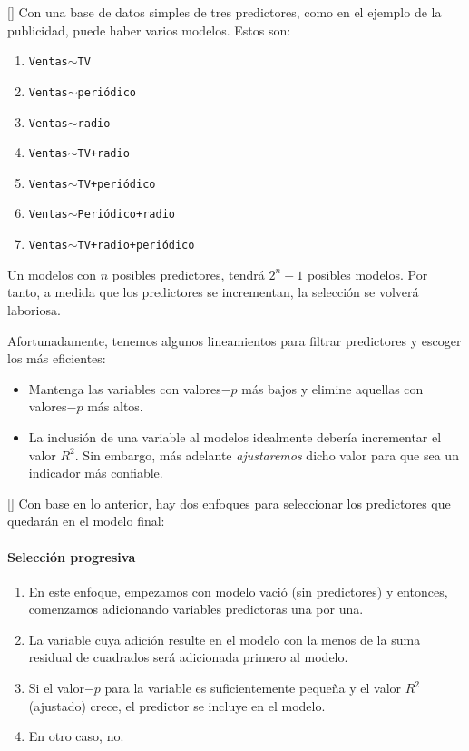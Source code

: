 []{}
Con una base de datos simples de tres predictores, como en el ejemplo de la publicidad, puede haber varios modelos. Estos son:
\begin{enumerate}[Modelo 1:]
 \item \texttt{Ventas$\sim$TV}
 \item \texttt{Ventas$\sim$periódico}
 \item \texttt{Ventas$\sim$radio}
 \item \texttt{Ventas$\sim$TV+radio}
 \item \texttt{Ventas$\sim$TV+periódico}
 \item \texttt{Ventas$\sim$Periódico+radio}
 \item \texttt{Ventas$\sim$TV+radio+periódico}
\end{enumerate}



\begin{rem}
 Un modelos con $n$ posibles predictores, tendrá $2^{n}-1$ posibles modelos. Por tanto, a medida que los predictores se incrementan, la selección se volverá laboriosa.
\end{rem}



Afortunadamente, tenemos algunos lineamientos para filtrar predictores y escoger los más eficientes:
\begin{itemize}
 \item Mantenga las variables con valores$-p$ más bajos y elimine aquellas con valores$-p$ más altos. 
 \item La inclusión de una variable al modelos idealmente debería incrementar el valor $R^{2}.$  Sin embargo, más adelante \emph{ajustaremos} dicho valor para que sea un indicador más confiable.
\end{itemize}


[]{}
Con base en lo anterior, hay dos enfoques para seleccionar los predictores que quedarán en el modelo final:


\paragraph{Selección progresiva}
\begin{enumerate}
 \item En este enfoque, empezamos con modelo vació (sin predictores) y entonces, comenzamos adicionando variables predictoras una por una. 
 \item La variable cuya adición resulte en el modelo con la menos de la suma residual de cuadrados será adicionada primero al modelo. \item Si el valor$-p$ para la variable es suficientemente pequeña y el valor $R^{2}$ (ajustado) crece, el predictor se incluye en el modelo. 
 \item En otro caso, no.
\end{enumerate}


